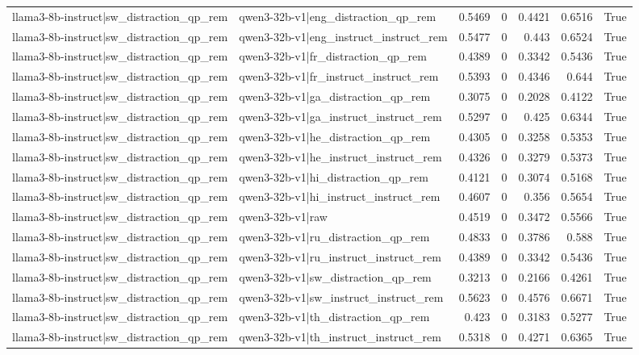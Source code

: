 \begin{table}
\begin{tabular}{l l r r r r l}
llama3-8b-instruct|sw_distraction_qp_rem & qwen3-32b-v1|eng_distraction_qp_rem & 0.5469 & 0 & 0.4421 & 0.6516 & True \\
llama3-8b-instruct|sw_distraction_qp_rem & qwen3-32b-v1|eng_instruct_instruct_rem & 0.5477 & 0 & 0.443 & 0.6524 & True \\
llama3-8b-instruct|sw_distraction_qp_rem & qwen3-32b-v1|fr_distraction_qp_rem & 0.4389 & 0 & 0.3342 & 0.5436 & True \\
llama3-8b-instruct|sw_distraction_qp_rem & qwen3-32b-v1|fr_instruct_instruct_rem & 0.5393 & 0 & 0.4346 & 0.644 & True \\
llama3-8b-instruct|sw_distraction_qp_rem & qwen3-32b-v1|ga_distraction_qp_rem & 0.3075 & 0 & 0.2028 & 0.4122 & True \\
llama3-8b-instruct|sw_distraction_qp_rem & qwen3-32b-v1|ga_instruct_instruct_rem & 0.5297 & 0 & 0.425 & 0.6344 & True \\
llama3-8b-instruct|sw_distraction_qp_rem & qwen3-32b-v1|he_distraction_qp_rem & 0.4305 & 0 & 0.3258 & 0.5353 & True \\
llama3-8b-instruct|sw_distraction_qp_rem & qwen3-32b-v1|he_instruct_instruct_rem & 0.4326 & 0 & 0.3279 & 0.5373 & True \\
llama3-8b-instruct|sw_distraction_qp_rem & qwen3-32b-v1|hi_distraction_qp_rem & 0.4121 & 0 & 0.3074 & 0.5168 & True \\
llama3-8b-instruct|sw_distraction_qp_rem & qwen3-32b-v1|hi_instruct_instruct_rem & 0.4607 & 0 & 0.356 & 0.5654 & True \\
llama3-8b-instruct|sw_distraction_qp_rem & qwen3-32b-v1|raw & 0.4519 & 0 & 0.3472 & 0.5566 & True \\
llama3-8b-instruct|sw_distraction_qp_rem & qwen3-32b-v1|ru_distraction_qp_rem & 0.4833 & 0 & 0.3786 & 0.588 & True \\
llama3-8b-instruct|sw_distraction_qp_rem & qwen3-32b-v1|ru_instruct_instruct_rem & 0.4389 & 0 & 0.3342 & 0.5436 & True \\
llama3-8b-instruct|sw_distraction_qp_rem & qwen3-32b-v1|sw_distraction_qp_rem & 0.3213 & 0 & 0.2166 & 0.4261 & True \\
llama3-8b-instruct|sw_distraction_qp_rem & qwen3-32b-v1|sw_instruct_instruct_rem & 0.5623 & 0 & 0.4576 & 0.6671 & True \\
llama3-8b-instruct|sw_distraction_qp_rem & qwen3-32b-v1|th_distraction_qp_rem & 0.423 & 0 & 0.3183 & 0.5277 & True \\
llama3-8b-instruct|sw_distraction_qp_rem & qwen3-32b-v1|th_instruct_instruct_rem & 0.5318 & 0 & 0.4271 & 0.6365 & True \\

\end{tabular}
\end{table}
